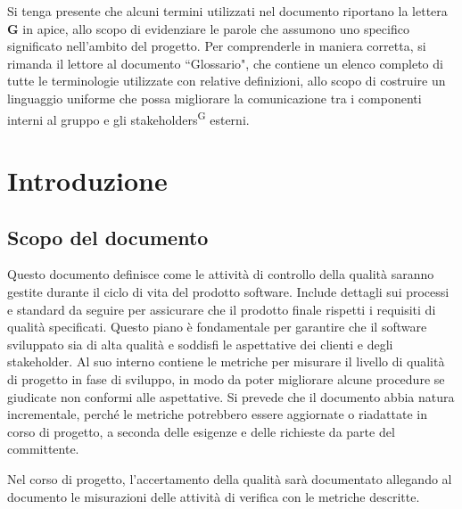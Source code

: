 \begin{beginningnote}
    Si tenga presente che alcuni termini utilizzati nel documento riportano la lettera \textbf{G} in apice, allo scopo di evidenziare le parole che assumono uno specifico significato nell'ambito del progetto. Per comprenderle in maniera corretta, si rimanda il lettore al documento ``Glossario", che contiene un elenco completo di tutte le terminologie utilizzate con relative definizioni, allo scopo di costruire un linguaggio uniforme che possa migliorare la comunicazione tra i componenti interni al gruppo e gli stakeholders\textsuperscript{G} esterni.   %
\end{beginningnote}


\section{Introduzione}

\subsection{Scopo del documento}\label{sec:scopo_del_documento}
\par Questo documento definisce come le attività di controllo della qualità saranno gestite durante il ciclo di vita del prodotto software. Include dettagli sui processi e standard da seguire per assicurare che il prodotto finale rispetti i requisiti di qualità specificati. Questo piano è fondamentale per garantire che il software sviluppato sia di alta qualità e soddisfi le aspettative dei clienti e degli stakeholder. Al suo interno contiene le metriche per misurare il livello di qualità di progetto in fase di sviluppo, in modo da poter migliorare alcune procedure se giudicate non conformi alle aspettative. Si prevede che il documento abbia natura incrementale, perché le metriche potrebbero essere aggiornate o riadattate in corso di progetto, a seconda delle esigenze e delle richieste da parte del committente.
\par Nel corso di progetto, l'accertamento della qualità sarà documentato allegando al documento le misurazioni delle attività di verifica con le metriche descritte.

